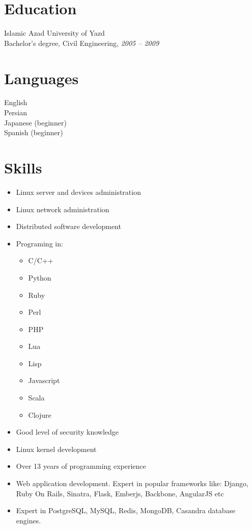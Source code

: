 \documentclass[a4paper,11pt]{article}
\begin{document}
\section*{Education}
Islamic Azad University of Yazd\\
Bachelor's degree, Civil Engineering, \emph{2005 – 2009}\\

\section*{Languages}
English\\
Persian\\
Japanese (beginner)\\
Spanish (beginner)\\


\section*{Skills}
\begin{itemize}
\item Linux server and devices administration
\item Linux network administration
\item Distributed software development
\item Programing in:
  \begin{itemize}
  \item C/C++
  \item Python
  \item Ruby
  \item Perl
  \item PHP
  \item Lua
  \item Lisp
  \item Javascript
  \item Scala
  \item Clojure
  \end{itemize}

\item Good level of security knowledge
\item Linux kernel development
\item Over 13 years of programming experience
\item Web application development. Expert in popular frameworks like: Django, Ruby On Rails, Sinatra, Flask, Emberjs, Backbone, AngularJS etc
\item Expert in PostgreSQL, MySQL, Redis, MongoDB, Casandra database engines.
\end{itemize}
\end{document}
